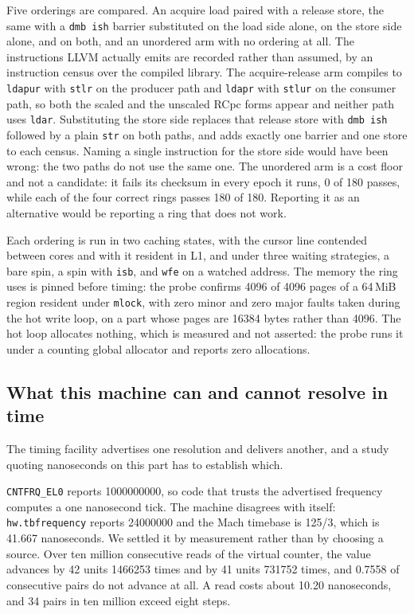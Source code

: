 \documentclass[conference]{IEEEtran}
\begin{document}
Five orderings are compared. An acquire load paired with a release store, the
same with a \texttt{dmb ish} barrier substituted on the load side alone, on the
store side alone, and on both, and an unordered arm with no ordering at all.
The instructions LLVM actually emits are recorded rather than assumed, by an
instruction census over the compiled library. The acquire-release arm compiles
to \texttt{ldapur} with \texttt{stlr} on the producer path and \texttt{ldapr}
with \texttt{stlur} on the consumer path, so both the scaled and the unscaled
RCpc forms appear and neither path uses \texttt{ldar}. Substituting the store
side replaces that release store with \texttt{dmb ish} followed by a plain
\texttt{str} on both paths, and adds exactly one barrier and one store to each
census. Naming a single instruction for the store side would have been wrong:
the two paths do not use the same one. The
unordered arm is a cost floor and not a candidate: it fails its checksum in
every epoch it runs, 0 of 180 passes, while each of the four correct rings
passes 180 of 180. Reporting it as an alternative would be reporting a ring that
does not work.

Each ordering is run in two caching states, with the cursor line contended
between cores and with it resident in L1, and under three waiting strategies, a
bare spin, a spin with \texttt{isb}, and \texttt{wfe} on a watched address. The
memory the ring uses is pinned before timing: the probe confirms 4096 of 4096
pages of a 64\,MiB region resident under \texttt{mlock}, with zero minor and
zero major faults taken during the hot write loop, on a part whose pages are
16384 bytes rather than 4096. The hot loop allocates nothing, which is measured
and not asserted: the probe runs it under a counting global allocator and
reports zero allocations.

\subsection{What this machine can and cannot resolve in time}

The timing facility advertises one resolution and delivers another, and a study
quoting nanoseconds on this part has to establish which.

\texttt{CNTFRQ\_EL0} reports 1000000000, so code that trusts the advertised
frequency computes a one nanosecond tick. The machine disagrees with itself:
\texttt{hw.tbfrequency} reports 24000000 and the Mach timebase is 125/3, which
is 41.667 nanoseconds. We settled it by measurement rather than by choosing a
source. Over ten million consecutive reads of the virtual counter, the value
advances by 42 units 1466253 times and by 41 units 731752 times, and 0.7558 of
consecutive pairs do not advance at all. A read costs about 10.20 nanoseconds,
and 34 pairs in ten million exceed eight steps.
\end{document}
